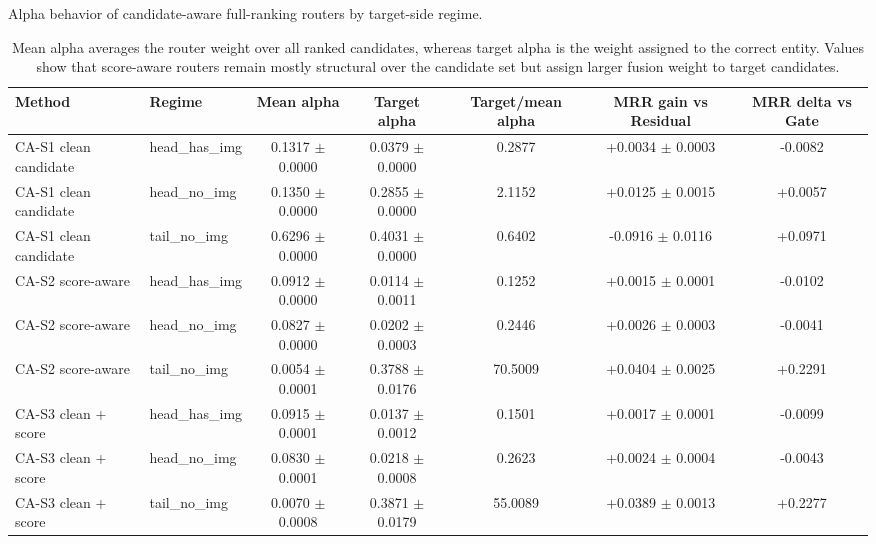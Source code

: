 \begin{table}[t]
\centering
\small
\caption{Alpha behavior of candidate-aware full-ranking routers by target-side regime.}
\label{tab:candidate_router_alpha_behavior}
\begin{tabular}{p{}p{}ccccc}
\toprule
Method & Regime & Mean alpha & Target alpha & Target/mean alpha & MRR gain vs Residual & MRR delta vs Gate \\
\midrule
CA-S1 clean candidate & head\_has\_img & 0.1317 $\pm$ 0.0000 & 0.0379 $\pm$ 0.0000 & 0.2877 & +0.0034 $\pm$ 0.0003 & -0.0082 \\
CA-S1 clean candidate & head\_no\_img & 0.1350 $\pm$ 0.0000 & 0.2855 $\pm$ 0.0000 & 2.1152 & +0.0125 $\pm$ 0.0015 & +0.0057 \\
CA-S1 clean candidate & tail\_no\_img & 0.6296 $\pm$ 0.0000 & 0.4031 $\pm$ 0.0000 & 0.6402 & -0.0916 $\pm$ 0.0116 & +0.0971 \\
CA-S2 score-aware & head\_has\_img & 0.0912 $\pm$ 0.0000 & 0.0114 $\pm$ 0.0011 & 0.1252 & +0.0015 $\pm$ 0.0001 & -0.0102 \\
CA-S2 score-aware & head\_no\_img & 0.0827 $\pm$ 0.0000 & 0.0202 $\pm$ 0.0003 & 0.2446 & +0.0026 $\pm$ 0.0003 & -0.0041 \\
CA-S2 score-aware & tail\_no\_img & 0.0054 $\pm$ 0.0001 & 0.3788 $\pm$ 0.0176 & 70.5009 & +0.0404 $\pm$ 0.0025 & +0.2291 \\
CA-S3 clean + score & head\_has\_img & 0.0915 $\pm$ 0.0001 & 0.0137 $\pm$ 0.0012 & 0.1501 & +0.0017 $\pm$ 0.0001 & -0.0099 \\
CA-S3 clean + score & head\_no\_img & 0.0830 $\pm$ 0.0001 & 0.0218 $\pm$ 0.0008 & 0.2623 & +0.0024 $\pm$ 0.0004 & -0.0043 \\
CA-S3 clean + score & tail\_no\_img & 0.0070 $\pm$ 0.0008 & 0.3871 $\pm$ 0.0179 & 55.0089 & +0.0389 $\pm$ 0.0013 & +0.2277 \\
\bottomrule
\end{tabular}
\vspace{0.4ex}\caption*{\footnotesize Mean alpha averages the router weight over all ranked candidates, whereas target alpha is the weight assigned to the correct entity. Values show that score-aware routers remain mostly structural over the candidate set but assign larger fusion weight to target candidates.}
\end{table}
